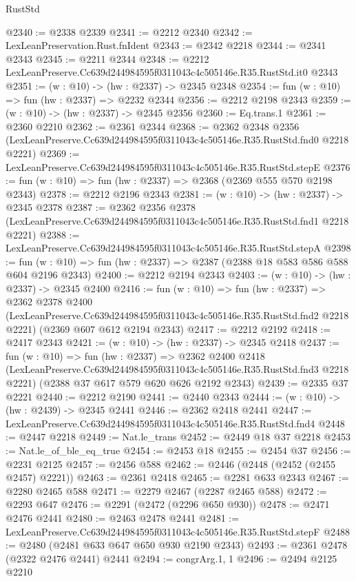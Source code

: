 \begin{lexlean}{RustStd}
\begin{coremodule}
@2340 := @2338 @2339
@2341 := @2212 @2340
@2342 := LexLeanPreservation.Rust.fnIdent
@2343 := @2342 @2218
@2344 := @2341 @2343
@2345 := @2211 @2344
@2348 := @2212 LexLeanPreserve.Cc639d244984595f0311043c4c505146e.R35.RustStd.it0 @2343
@2351 := (w : @10) -> (hw : @2337) -> @2345 @2348
@2354 := fun (w : @10) => fun (hw : @2337) => @2232 @2344
@2356 := @2212 @2198 @2343
@2359 := (w : @10) -> (hw : @2337) -> @2345 @2356
@2360 := Eq.trans.{1}
@2361 := @2360 @2210
@2362 := @2361 @2344
@2368 := @2362
    @2348
    @2356
    (LexLeanPreserve.Cc639d244984595f0311043c4c505146e.R35.RustStd.fnd0 @2218 @2221)
@2369 := LexLeanPreserve.Cc639d244984595f0311043c4c505146e.R35.RustStd.stepE
@2376 := fun (w : @10) => fun (hw : @2337) => @2368 (@2369 @555 @570 @2198 @2343)
@2378 := @2212 @2196 @2343
@2381 := (w : @10) -> (hw : @2337) -> @2345 @2378
@2387 := @2362
    @2356
    @2378
    (LexLeanPreserve.Cc639d244984595f0311043c4c505146e.R35.RustStd.fnd1 @2218 @2221)
@2388 := LexLeanPreserve.Cc639d244984595f0311043c4c505146e.R35.RustStd.stepA
@2398 := fun (w : @10) => fun (hw : @2337) => @2387 (@2388 @18 @583 @586 @588 @604 @2196 @2343)
@2400 := @2212 @2194 @2343
@2403 := (w : @10) -> (hw : @2337) -> @2345 @2400
@2416 := fun (w : @10) =>
  fun (hw : @2337) =>
  @2362
    @2378
    @2400
    (LexLeanPreserve.Cc639d244984595f0311043c4c505146e.R35.RustStd.fnd2 @2218 @2221)
    (@2369 @607 @612 @2194 @2343)
@2417 := @2212 @2192
@2418 := @2417 @2343
@2421 := (w : @10) -> (hw : @2337) -> @2345 @2418
@2437 := fun (w : @10) =>
  fun (hw : @2337) =>
  @2362
    @2400
    @2418
    (LexLeanPreserve.Cc639d244984595f0311043c4c505146e.R35.RustStd.fnd3 @2218 @2221)
    (@2388 @37 @617 @579 @620 @626 @2192 @2343)
@2439 := @2335 @37 @2221
@2440 := @2212 @2190
@2441 := @2440 @2343
@2444 := (w : @10) -> (hw : @2439) -> @2345 @2441
@2446 := @2362 @2418 @2441
@2447 := LexLeanPreserve.Cc639d244984595f0311043c4c505146e.R35.RustStd.fnd4
@2448 := @2447 @2218
@2449 := Nat.le_trans
@2452 := @2449 @18 @37 @2218
@2453 := Nat.le_of_ble_eq_true
@2454 := @2453 @18
@2455 := @2454 @37
@2456 := @2231 @2125
@2457 := @2456 @588
@2462 := @2446 (@2448 (@2452 (@2455 @2457) @2221))
@2463 := @2361 @2418
@2465 := @2281 @633 @2343
@2467 := @2280 @2465 @588
@2471 := @2279 @2467 (@2287 @2465 @588)
@2472 := @2293 @647
@2476 := @2291 (@2472 (@2296 @650 @930))
@2478 := @2471 @2476 @2441
@2480 := @2463 @2478 @2441
@2481 := LexLeanPreserve.Cc639d244984595f0311043c4c505146e.R35.RustStd.stepF
@2488 := @2480 (@2481 @633 @647 @650 @930 @2190 @2343)
@2493 := @2361 @2478 (@2322 @2476 @2441) @2441
@2494 := congrArg.{1, 1}
@2496 := @2494 @2125 @2210

\end{coremodule}
\end{lexlean}
